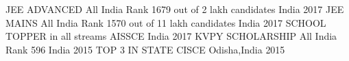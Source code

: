 \begin{cvhonors}
  \cvhonor
    {JEE ADVANCED}
    {All India Rank 1679 out of 2 lakh candidates}
    {India}
    {2017}
  \cvhonor
    {JEE MAINS}
    {All India Rank 1570 out of 11 lakh candidates}
    {India}
    {2017}
    \cvhonor
    {SCHOOL TOPPER in all streams}
    {AISSCE}
    {India}
    {2017}
  \cvhonor
    {KVPY SCHOLARSHIP}
    {All India Rank 596}
    {India}
    {2015}
    \cvhonor
    {TOP 3 IN STATE}
    {CISCE}
    {Odisha,India}
    {2015}
  
\end{cvhonors}
